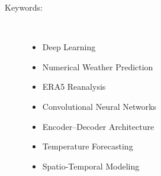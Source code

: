 
\begin{description}
\item [Keywords:] \mbox{} \\[-20pt]
\begin{itemize}
  \item Deep Learning
  \item Numerical Weather Prediction
  \item ERA5 Reanalysis
  \item Convolutional Neural Networks
  \item Encoder–Decoder Architecture
  \item Temperature Forecasting
  \item Spatio-Temporal Modeling

\end{itemize}
\end{description}